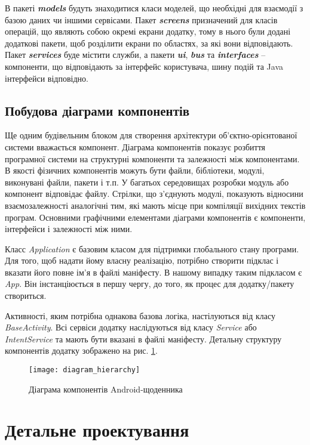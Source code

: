 \documentclass[../main.tex]{subfiles}
\begin{document}
В пакеті \textit{\textbf{models}} будуть знаходитися класи моделей, що необхідні для взаємодії з базою даних чи іншими сервісами. Пакет \textit{\textbf{screens}} призначений для класів операцій, що являють собою окремі екрани додатку, тому в нього були додані додаткові пакети, щоб розділити екрани по областях, за які вони відповідають. Пакет \textit{\textbf{services}} буде містити служби, а пакети \textit{\textbf{ui}}, \textit{\textbf{bus}} та \textit{\textbf{interfaces}} -- компоненти, що відповідають за інтерфейс користувача, шину подій та Java інтерфейси відповідно. 

\subsection{Побудова діаграми компонентів}
Ще одним будівельним блоком для створення архітектури об'єктно-орієнтованої системи вважається компонент. Діаграма компонентів показує розбиття програмної системи на структурні компоненти та залежності між компонентами. В якості фізичних компонентів можуть бути файли, бібліотеки, модулі, виконувані файли, пакети і т.п. У багатьох середовищах розробки модуль або компонент відповідає файлу. Стрілки, що з'єднують модулі, показують відносини взаємозалежності аналогічні тим, які мають місце при компіляції вихідних текстів програм. Основними графічними елементами діаграми компонентів є компоненти, інтерфейси і залежності між ними. 

Класс \textit{Application} є базовим класом для підтримки глобального стану програми. Для того, щоб надати йому власну реалізацію, потрібно створити підклас і вказати його повне ім'я в файлі маніфесту. В нашому випадку таким підкласом є \textit{App}. Він інстанціюється в першу чергу, до того, як процес для додатку/пакету створиться.

Активності, яким потрібна однакова базова логіка, настілуються від класу \textit{BaseActivity}. Всі сервіси додатку наслідуються від класу \textit{Service} або \textit{IntentService} та мають бути вказані в файлі маніфесту. Детальну структуру компонентів додатку зображено на рис. \ref{diagram:hierarchy}.

\begin{figure}[H]
	\centering
	\texttt{[image: diagram\_hierarchy]}
	\caption{Діаграма компонентів Android-щоденника}
	\label{diagram:hierarchy}
\end{figure}

\section{Детальне проектування}
\end{document}
